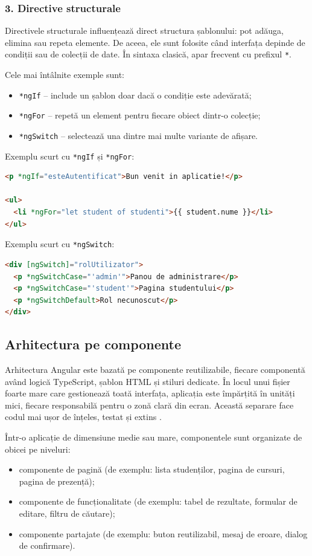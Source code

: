 \subsubsection{3. Directive structurale}
Directivele structurale influențează direct structura șablonului: pot adăuga, elimina sau repeta elemente. De aceea, ele sunt folosite când interfața depinde de condiții sau de colecții de date. În sintaxa clasică, apar frecvent cu prefixul \texttt{*}.

Cele mai întâlnite exemple sunt:
\begin{itemize}
		\item \texttt{*ngIf} -- include un șablon doar dacă o condiție este adevărată;
		\item \texttt{*ngFor} -- repetă un element pentru fiecare obiect dintr-o colecție;
		\item \texttt{*ngSwitch} -- selectează una dintre mai multe variante de afișare.
\end{itemize}
Exemplu scurt cu \texttt{*ngIf} și \texttt{*ngFor}:

\begin{lstlisting}[language=HTML]
<p *ngIf="esteAutentificat">Bun venit in aplicatie!</p>

<ul>
  <li *ngFor="let student of studenti">{{ student.nume }}</li>
</ul>
\end{lstlisting}

Exemplu scurt cu \texttt{*ngSwitch}:

\begin{lstlisting}[language=HTML]
<div [ngSwitch]="rolUtilizator">
  <p *ngSwitchCase="'admin'">Panou de administrare</p>
  <p *ngSwitchCase="'student'">Pagina studentului</p>
  <p *ngSwitchDefault>Rol necunoscut</p>
</div>
\end{lstlisting}

\subsection{Arhitectura pe componente}
Arhitectura Angular este bazată pe componente reutilizabile, fiecare componentă având logică TypeScript, șablon HTML și stiluri dedicate. În locul unui fișier foarte mare care gestionează toată interfața, aplicația este împărțită în unități mici, fiecare responsabilă pentru o zonă clară din ecran. Această separare face codul mai ușor de înțeles, testat și extins \cite{google_angular_2024}.

Într-o aplicație de dimensiune medie sau mare, componentele sunt organizate de obicei pe niveluri:
\begin{itemize}
	\item componente de pagină (de exemplu: lista studenților, pagina de cursuri, pagina de prezență);
	\item componente de funcționalitate (de exemplu: tabel de rezultate, formular de editare, filtru de căutare);
	\item componente partajate (de exemplu: buton reutilizabil, mesaj de eroare, dialog de confirmare).
\end{itemize}

